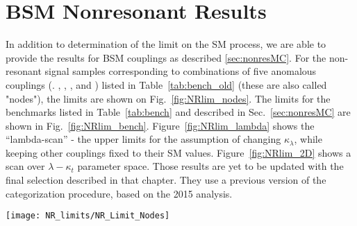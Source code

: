 \section{BSM Nonresonant Results}
\label{sec:nonresonant-results}


In addition to determination of the limit on the SM process, we are
able to provide the results for BSM couplings as described
\ref{sec:nonresMC}.  For the non-resonant signal samples corresponding
to combinations of five anomalous couplings (\kapl. \kapt, \ctwo,
\ctwog, and \cg) listed in Table~\ref{tab:bench_old} (these are also
called "nodes"), the limits are shown on Fig.~\ref{fig:NRlim_nodes}.
The limits for the benchmarks listed in Table~\ref{tab:bench} and
described in Sec.~\ref{sec:nonresMC} are shown in
Fig.~\ref{fig:NRlim_bench}.  Figure~\ref{fig:NRlim_lambda} shows the
``lambda-scan'' - the upper limits for the assumption of changing
$\kappa_\lambda$, while keeping other couplings fixed to their SM
values. Figure~\ref{fig:NRlim_2D} shows a scan over $\lambda-\kappa_t$
parameter space. 
Those results are yet to be updated with the final selection described in that chapter. They use a previous version of the categorization procedure, based on the 2015 analysis.

% 

\begin{figure*}[h]
  \centering
  \texttt{[image: NR\_limits/NR\_Limit\_Nodes]}\hfil
  \caption{Limits for Nodes specified in Table~\ref{tab:bench_old}.}
  \label{fig:NRlim_nodes}
\end{figure*}


